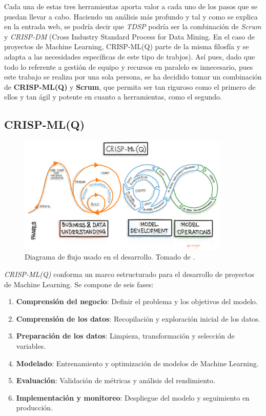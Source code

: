 Cada una de estas tres herramientas aporta valor a cada uno de los pasos que se puedan llevar a cabo. Haciendo un análisis más profundo y tal y como se explica en la entrada web\cite{TDSP-PM}, se podría decir que \emph{TDSP} podría ser la combinación de \emph{Scrum} y \emph{CRISP-DM} (Cross Industry Standard Process for Data Mining. En el caso de proyectos de Machine Learning, CRISP-ML(Q) parte de la misma filosfía y se adapta a las necesidades específicas de este tipo de trabjos). Así pues, dado que todo lo referente a gestión de equipo y recursos en paralelo es innecesario, pues este trabajo se realiza por una sola persona, se ha decidido tomar un combinación de \textbf{CRISP-ML(Q)} y \textbf{Scrum}, que permita ser tan riguroso como el primero de ellos y tan ágil y potente en cuanto a herramientas, como el segundo.

\subsection{CRISP-ML(Q)}

\begin{figure}[H]
    \centering
    \includegraphics[width=0.9\textwidth]{images/crisp-ml-process.jpg}
    \caption{Diagrama de flujo usado en el desarrollo. Tomado de \cite{crispml}.}
    \label{fig:crispml-q-diagram}
  \end{figure}

\emph{CRISP-ML(Q)} conforma un marco estructurado para el desarrollo de proyectos de Machine Learning. Se compone de seis fases:

\begin{enumerate}
    \item \textbf{Comprensión del negocio}: Definir el problema y los objetivos del modelo.
    \item \textbf{Comprensión de los datos}: Recopilación y exploración inicial de los datos.
    \item \textbf{Preparación de los datos}: Limpieza, transformación y selección de variables.
    \item \textbf{Modelado}: Entrenamiento y optimización de modelos de Machine Learning.
    \item \textbf{Evaluación}: Validación de métricas y análisis del rendimiento.
    \item \textbf{Implementación y monitoreo}: Despliegue del modelo y seguimiento en producción.
\end{enumerate}

